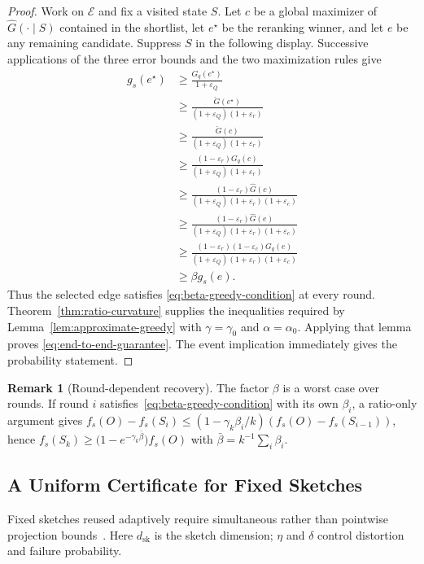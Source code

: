 \documentclass[conference]{IEEEtran}
\theoremstyle{definition}
\newtheorem{remark}{Remark}
\newcommand{\dsk}{d_{\mathrm{sk}}}
\begin{document}
\begin{proof}
Work on $\mathcal E$ and fix a visited state $S$.
Let $c$ be a global maximizer of $\widehat G(\cdot\mid S)$ contained
in the shortlist, let ${e^\star}$ be the reranking winner, and let $e$ be
any remaining candidate.  Suppress $S$ in the following display.
Successive applications of the three error bounds and the two
maximization rules give
\begin{align*}
 g_s({e^\star})
 &\geq\frac{G_q({e^\star})}{1+\varepsilon_Q}\\
 &\geq\frac{\check G({e^\star})}{(1+\varepsilon_Q)(1+\varepsilon_r)}\\
 &\geq\frac{\check G(c)}{(1+\varepsilon_Q)(1+\varepsilon_r)}\\
 &\geq\frac{(1-\varepsilon_r)G_q(c)}
                {(1+\varepsilon_Q)(1+\varepsilon_r)}\\
 &\geq\frac{(1-\varepsilon_r)\widehat G(c)}
                {(1+\varepsilon_Q)(1+\varepsilon_r)(1+\varepsilon_c)}\\
 &\geq\frac{(1-\varepsilon_r)\widehat G(e)}
                {(1+\varepsilon_Q)(1+\varepsilon_r)(1+\varepsilon_c)}\\
 &\geq\frac{(1-\varepsilon_r)(1-\varepsilon_c)G_q(e)}
                {(1+\varepsilon_Q)(1+\varepsilon_r)(1+\varepsilon_c)}\\
 &\geq\beta g_s(e).
\end{align*}
Thus the selected edge satisfies
\eqref{eq:beta-greedy-condition} at every round.
Theorem~\ref{thm:ratio-curvature} supplies the inequalities required
by Lemma~\ref{lem:approximate-greedy} with
$\gamma=\gamma_0$ and $\alpha=\alpha_0$.
Applying that lemma proves \eqref{eq:end-to-end-guarantee}.
The event implication immediately gives the probability statement.
\end{proof}

\begin{remark}[Round-dependent recovery]
\label{rem:average-beta}
The factor $\beta$ is a worst case over rounds. If round $i$
satisfies~\eqref{eq:beta-greedy-condition} with its own $\beta_i$,
a ratio-only argument gives
$f_s(O)-f_s(S_i)\le(1-\gamma_k\beta_i/k)(f_s(O)-f_s(S_{i-1}))$, hence
$f_s(S_k)\ge\bigl(1-e^{-\gamma_k\bar\beta}\bigr)f_s(O)$ with
$\bar\beta=k^{-1}\sum_i\beta_i$. \end{remark}

\subsection{A Uniform Certificate for Fixed Sketches}
\label{sec:theory-practice}
Fixed sketches reused adaptively require simultaneous rather than
pointwise projection bounds~\cite{spielman2011,skorski2021}.
Here $\dsk$ is the sketch dimension; $\eta$ and $\delta$ control
distortion and failure probability.
\end{document}
